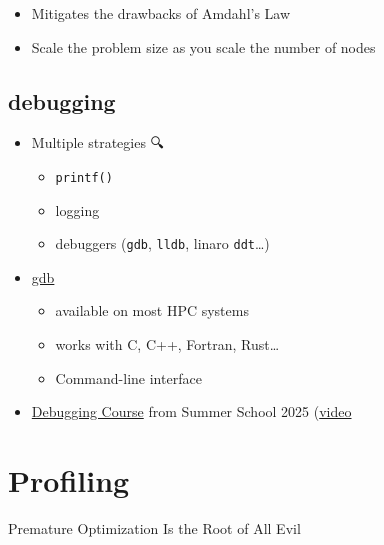 \documentclass[
  letterpaper,
  DIV=11,
  numbers=noendperiod]{scrartcl}
\providecommand{\tightlist}{%
  \setlength{\itemsep}{0pt}\setlength{\parskip}{0pt}}
\begin{document}
\begin{itemize}
\tightlist
\item
  Mitigates the drawbacks of Amdahl's Law
\item
  Scale the problem size as you scale the number of nodes
\end{itemize}

\subsection{debugging}\label{debugging}

\begin{itemize}
\tightlist
\item
  Multiple strategies {🔍}{🐛}

  \begin{itemize}
  \tightlist
  \item
    \texttt{printf()}
  \item
    logging
  \item
    debuggers (\texttt{gdb}, \texttt{lldb}, linaro \texttt{ddt}\ldots)
  \end{itemize}
\item
  \href{https://www.sourceware.org/gdb/}{gdb}

  \begin{itemize}
  \tightlist
  \item
    available on most HPC systems
  \item
    works with C, C++, Fortran, Rust\ldots{}
  \item
    Command-line interface
  \end{itemize}
\item
  \href{https://github.com/Cambridge-ICCS/debugging-workshop}{Debugging
  Course} from Summer School 2025
  (\href{https://youtu.be/Oo3cPIckI0Y?si=tFr1UYZLtP8vkppH}{video}
\end{itemize}

\section{Profiling}\label{profiling}

\begin{tcolorbox}[enhanced jigsaw, arc=.35mm, bottomrule=.15mm, bottomtitle=1mm, breakable, colback=white, colbacktitle=quarto-callout-warning-color!10!white, colframe=quarto-callout-warning-color-frame, coltitle=black, left=2mm, leftrule=.75mm, opacityback=0, opacitybacktitle=0.6, rightrule=.15mm, title=\textcolor{quarto-callout-warning-color}{\faExclamationTriangle}\hspace{0.5em}{Warning!}, titlerule=0mm, toprule=.15mm, toptitle=1mm]

Premature Optimization Is the Root of All Evil

\end{tcolorbox}
\end{document}
